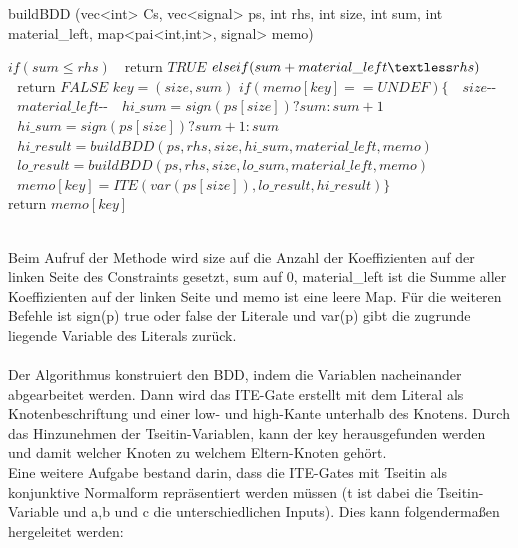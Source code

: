 \documentclass[a4,abstract=on]{scrartcl}
\begin{document}
\begin{algorithm}
\caption{buildBDD (vec<int> Cs, vec<signal> ps, int rhs, int size, int sum, int material\_left, map<pai<int,int>, signal> memo)}
\label{alg:buildBDD}
\begin{algorithmic}

\State $\text{}if (sum \leq rhs)$
\State $\text{~~return } TRUE$
\State $\text{}else if (sum + material\_left \textless rhs)$
\State $\text{~~return } FALSE$
\State $\text{} key = (size, sum)$
\State $\text{}if (memo[key] == UNDEF) \{$
\State $\text{~~} size\text{-{}-}$
\State $\text{~~} material\_left \text{-{}-}$
\State $\text{~~} hi\_sum = sign(ps[size]) ? sum : sum + 1$
\State $\text{~~} hi\_sum = sign(ps[size]) ? sum + 1 : sum$
\State $\text{~~} hi\_result = buildBDD(ps , rhs, size, hi\_sum, material\_left, memo)$
\State $\text{~~} lo\_result = buildBDD(ps , rhs, size, lo\_sum, material\_left, memo)$
\State $\text{~~} memo[key] = ITE(var(ps[size]), lo\_result, hi\_result)\}$
\State $\text{return }memo[key]$
\end{algorithmic}
\end{algorithm}
\ \\
Beim Aufruf der Methode wird size auf die Anzahl der Koeffizienten auf der linken Seite des Constraints gesetzt, sum auf $0$, material\_left ist die Summe aller Koeffizienten auf der linken Seite und memo ist eine leere Map. Für die weiteren Befehle ist sign(p) true oder false der Literale und var(p) gibt die zugrunde liegende Variable des Literals zurück.\\
\ \\
Der Algorithmus konstruiert den BDD, indem die Variablen nacheinander abgearbeitet werden. Dann wird das ITE-Gate erstellt mit dem Literal als Knotenbeschriftung und einer low- und high-Kante unterhalb des Knotens. Durch das Hinzunehmen der Tseitin-Variablen, kann der key herausgefunden werden und damit welcher Knoten zu welchem Eltern-Knoten gehört.\\
Eine weitere Aufgabe bestand darin, dass die ITE-Gates mit Tseitin als konjunktive Normalform repräsentiert werden müssen (t ist dabei die Tseitin-Variable und a,b und c die unterschiedlichen Inputs). Dies kann folgendermaßen hergeleitet werden:\\
\end{document}
